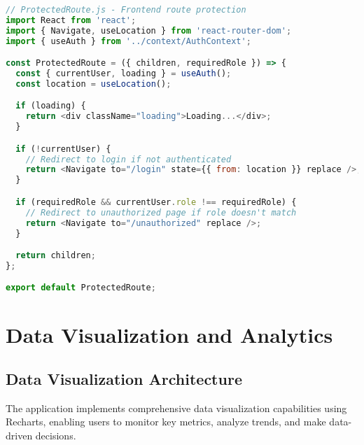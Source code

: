 \documentclass[12pt,a4paper]{article}
\begin{document}
\begin{lstlisting}[language=JavaScript]
// ProtectedRoute.js - Frontend route protection
import React from 'react';
import { Navigate, useLocation } from 'react-router-dom';
import { useAuth } from '../context/AuthContext';

const ProtectedRoute = ({ children, requiredRole }) => {
  const { currentUser, loading } = useAuth();
  const location = useLocation();

  if (loading) {
    return <div className="loading">Loading...</div>;
  }

  if (!currentUser) {
    // Redirect to login if not authenticated
    return <Navigate to="/login" state={{ from: location }} replace />;
  }

  if (requiredRole && currentUser.role !== requiredRole) {
    // Redirect to unauthorized page if role doesn't match
    return <Navigate to="/unauthorized" replace />;
  }

  return children;
};

export default ProtectedRoute;
\end{lstlisting}

\section{Data Visualization and Analytics}

\subsection{Data Visualization Architecture}
The application implements comprehensive data visualization capabilities using Recharts, enabling users to monitor key metrics, analyze trends, and make data-driven decisions.
\end{document}
